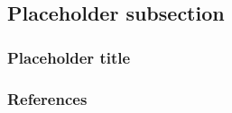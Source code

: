 \documentclass[
	11pt, %
	aspectratio=1610, %
]{beamer}
\begin{document}

\subsection{Placeholder subsection}


\begin{frame}
	\frametitle{Placeholder title}

\end{frame}


\begin{frame}
	\frametitle{References}

\end{frame}





\end{document}
